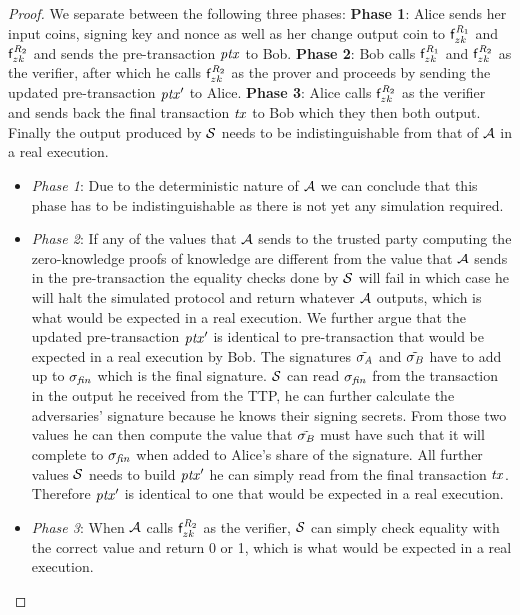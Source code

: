 \begin{proof}
    We separate between the following three phases:
    \textbf{Phase 1}: Alice sends her input coins, signing key and nonce as well as her change output coin to $\mathsf{f}^{\mathit{R}_1}_{zk}$ and $\mathsf{f}^{\mathit{R}_2}_{zk}$ and sends the pre-transaction $\mathit{ptx}$ to Bob.
    \textbf{Phase 2}: Bob calls $\mathsf{f}^{\mathit{R}_1}_{zk}$ and $\mathsf{f}^{\mathit{R}_2}_{zk}$ as the verifier, after which he calls $\mathsf{f}^{\mathit{R}_2}_{zk}$ as the prover and proceeds by sending the updated pre-transaction ${\mathit{ptx}}'$ to Alice.
    \textbf{Phase 3}: Alice calls $\mathsf{f}^{\mathit{R}_2}_{zk}$ as the verifier and sends back the final transaction $\mathit{tx}$ to Bob which they then both output.
    Finally the output produced by $\mathcal{S}$ needs to be indistinguishable from that of $\mathcal{A}$ in a real execution.
    \begin{itemize}
        \item \textit{Phase 1}: Due to the deterministic nature of $\mathcal{A}$ we can conclude that this phase has to be indistinguishable as there is not yet any simulation required.
        \item \textit{Phase 2}: If any of the values that $\mathcal{A}$ sends to the trusted party computing the zero-knowledge proofs of knowledge are different from the value that $\mathcal{A}$ sends in the pre-transaction the equality checks done by $\mathcal{S}$ will fail in which case he will halt the simulated protocol and return whatever $\mathcal{A}$ outputs, which is what would be expected in a real execution.
        We further argue that the updated pre-transaction ${\mathit{ptx}}'$ is identical to pre-transaction that would be expected in a real execution by Bob.
        The signatures $\tilde{\sigma_{\mathit{A}}}$ and $\tilde{\sigma_{\mathit{B}}}$ have to add up to $\sigma_{\mathit{fin}}$ which is the final signature.
        $\mathcal{S}$ can read $\sigma_{\mathit{fin}}$ from the transaction in the output he received from the TTP, he can further calculate the adversaries' signature because he knows their signing secrets.
        From those two values he can then compute the value that $\tilde{\sigma_{\mathit{B}}}$ must have such that it will complete to $\sigma_{\mathit{fin}}$ when added to Alice's share of the signature.
        All further values $\mathcal{S}$ needs to build ${\mathit{ptx}}'$ he can simply read from the final transaction $\mathit{tx}$.
        Therefore ${\mathit{ptx}}'$ is identical to one that would be expected in a real execution.
        \item \textit{Phase 3}: When $\mathcal{A}$ calls $\mathsf{f}^{\mathit{R}_2}_{zk}$ as the verifier, $\mathcal{S}$ can simply check equality with the correct value and return 0 or 1, which is what would be expected in a real execution.
    \end{itemize}



\end{proof}
